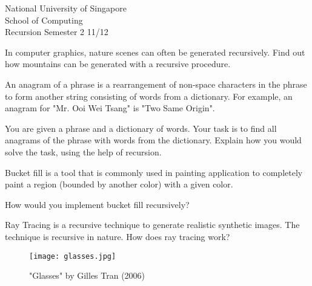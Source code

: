 \documentclass[answers,a4paper,11pt]{exam}
\begin{document}
\extraheadheight{.5in}
%
{\large\sf National University of Singapore\\ School of Computing \\
\LARGE\sf Recursion}%
{\large\sf Semester 2 11/12}
\firstpageheadrule
\pagestyle{headandfoot}

\begin{questions}
\question
In computer graphics, nature scenes can often be generated recursively.  Find out how mountains can be generated with a recursive procedure.
\fillwithdottedlines{5in}
\newpage

\question
An anagram of a phrase is a rearrangement of non-space characters in the phrase to form another string consisting of words from a dictionary.  For example, an anagram for "Mr. Ooi Wei Tsang" is "Two Same Origin".

You are given a phrase and a dictionary of words.  Your task is to find all anagrams of the phrase with words from the dictionary.  Explain how you would solve the task, using the help of recursion.

\fillwithdottedlines{5in}
\newpage
\question

Bucket fill is a tool that is commonly used in painting application to completely paint a region (bounded by another color) with a given color.

How would you implement bucket fill recursively?

\fillwithdottedlines{5in}
\newpage
\question

Ray Tracing is a recursive technique to generate realistic synthetic images.  The technique is recursive in nature.  How does ray tracing work?

\begin{figure}[h!]
\begin{center}
\texttt{[image: glasses.jpg]}
\caption{"Glasses" by Gilles Tran (2006)}
\end{center}
\end{figure}

\fillwithdottedlines{4in}
\end{questions}
\end{document}
